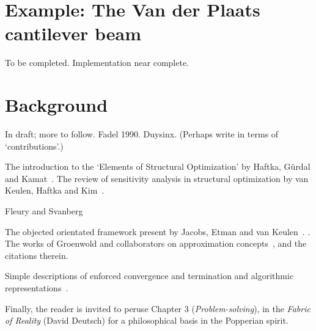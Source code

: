 \documentclass[11pt]{article}
\begin{document}
\section*{Example: The Van der Plaats cantilever beam}

To be completed. Implementation near complete.


\section*{Background}

In draft; more to follow. Fadel 1990. Duysinx. (Perhaps write in terms of `contributions'.)

The introduction to the `Elements of Structural Optimization' by Haftka, G\"urdal and Kamat~\cite{haftka1990}. The review of sensitivity analysis in structural optimization by van Keulen, Haftka and Kim~\cite{keulen2005}. 

Fleury \cite{fleury1986structural,fleury1989conlin} and Svanberg \cite{Svanberg1987method}

The objected orientated framework present by Jacobs, Etman and van Keulen~\cite{jacobs2004framework}. \cite{groenwold2011saoi}. The works of Groenwold and collaborators on approximation concepts~\cite{groenwold2010quadratic,groenwold2010approximated,groenwold2008equivalence,groenwold2007incomplete,etman2012first,lutchman2014using,groenwold2008sequential,etman2009diagonal,wood2009non,etman2006sequential}, and the citations therein.

Simple descriptions of enforced convergence and termination and algorithmic representations~\cite{groenwold2010conditional,groenwold2009globally,park2014globally,svanberg2002class}.

Finally, the reader is invited to peruse Chapter 3 (\emph{Problem-solving}), in the \emph{Fabric of Reality} (David Deutsch) for a philosophical basis in the Popperian spirit. 

 
 
\end{document}
